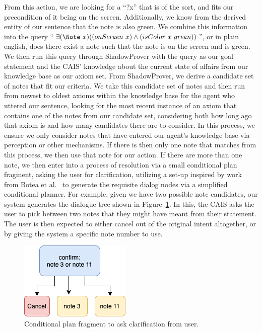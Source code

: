 From this action, we are looking for a ``?x'' that is of the \Note sort, and fits our
precondition of it being on the screen. Additionally, we know from the derived entity of
our sentence that the note is also green. We combine this information into the query
``$\exists(\Note\ x)((onScreen\ x) \land (isColor\ x\ green))$'', or in plain english, does there exist 
a note such that the note is on the screen and is green. We then run this query through
ShadowProver with the query as our goal statement and the CAIS' knowledge about the current
state of affairs from our knowledge base as our axiom set. From ShadowProver, we derive
a candidate set of notes that fit our criteria. We take this candidate set of notes and
then run from newest to oldest axioms within the knowledge base for the agent who uttered
our sentence, looking for the most recent instance of an axiom that contains one of the
notes from our candidate set, considering both how long ago that axiom is and how many
candidates there are to consider. In this process, we ensure we only consider notes that
have entered our agent's knowledge base via perception or other mechanisms. If there is
then only one note that matches from this process, we then use that note for our action.
If there are more than one note, we then enter into a process of resolution via a small
conditional plan fragment, asking the user for clarification, utilizing a set-up inspired
by work from Botea et al.~\cite{botea_generating_2019} to generate the requisite dialog
nodes via a simplified conditional planner. For example, given we have two possible note
candidates, our system generates the dialogue tree shown in 
Figure~\ref{fig:intent_resolution_fragment}. In this, the CAIS asks the user to pick between
two  notes that they might have meant from their statement. The user is then expected to either
cancel out of the original intent altogether, or by giving the system a specific note number
to use.

\begin{figure}
\centering
  \includegraphics[width=0.3\columnwidth]{chapters/06_planning/figures/intent_resolution_fragment.png}
  \caption{Conditional plan fragment to ask clarification from user.}
  \label{fig:intent_resolution_fragment}
\end{figure}